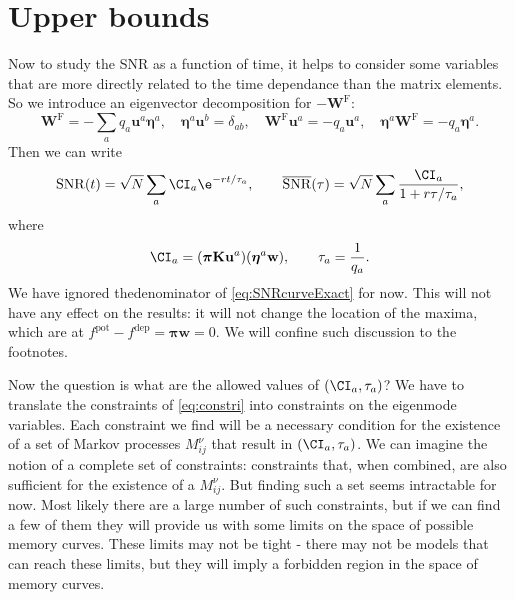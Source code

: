 \documentclass[12pt]{article}
\newcommand{\eqm}{\pi}
\newcommand{\eq}{\boldsymbol{\eqm}}
\newcommand{\wm}{w}
\newcommand{\w}{\mathbf{\wm}}
\newcommand{\Wm}{W}
\newcommand{\W}{\mathbf{\Wm}}
\newcommand{\MMdm}{M}
\newcommand{\encm}{K}
\newcommand{\enc}{\mathbf{\encm}}
\newcommand{\frg}{\W^{\mathrm{F}}}
\newcommand{\evrm}{u}
\newcommand{\evr}{\mathbf{\evrm}}
\newcommand{\evlm}{\eta}
\newcommand{\evl}{\boldsymbol{\evlm}}
\newcommand{\pot}{^{\text{pot}}}
\newcommand{\dep}{^{\text{dep}}}
\DeclareMathOperator{\snr}{SNR}
\newcommand{\snrb}{\overline{\snr}}
\begin{document}

\section{Upper bounds}\label{sec:upperbnds}

Now to study the SNR as a function of  time, it helps to consider some variables that are more directly related to the time dependance than the matrix elements. 
So we introduce an eigenvector decomposition for \(-\frg\):
%
\begin{equation}\label{eq:eigendecomp}
  \frg = - \sum_a q_a \evr^a \evl^a,
  \quad
  \evl^a \evr^b = \delta_{ab},
  \quad
  \frg \evr^a = -q_a \evr^a,
  \quad
  \evl^a \frg = -q_a \evl^a.
\end{equation}
%
Then we can write
%
\begin{equation}\label{eq:snreig}
  \snr(t) = \sqrt{N}\sum_a \CI_a \e^{-rt/\tau_a},
  \qquad
  \snrb(\tau) = \sqrt{N}\sum_a \frac{\CI_a}{1+r\tau/\tau_a},
\end{equation}
%
where
%
\begin{equation}\label{eq:snrcoeffs}
  \CI_a = (\eq \enc \evr^a) (\evl^a \w),
  \qquad
  \tau_a = \frac{1}{q_a}.
\end{equation}
%
We have ignored thedenominator of \cref{eq:SNRcurveExact} for now.
This will not have any effect on the results: it will not change the location of the maxima, which are at \( f\pot - f\dep = \eq \w = 0 \).
We will confine such discussion to the footnotes.

Now the question is what are the allowed values of \( (\CI_a, \tau_a) \)?
We have to translate the constraints of \cref{eq:constri} into constraints on the eigenmode variables.
Each constraint we find will be a necessary condition for the existence of a set of Markov processes \( \MMdm_{ij}^\nu \) that result in \( (\CI_a, \tau_a) \).
We can imagine the notion of a complete set of constraints: constraints that, when combined, are also sufficient for the existence of a \( \MMdm_{ij}^\nu \).
But finding such a set seems intractable for now.
Most likely there are a large number of such constraints, but if we can find a few of them they will provide us with some limits on the space of possible memory curves.
These limits may not be tight - there may not be models that can reach these limits, but they will imply a forbidden region in the space of memory curves.


\end{document}
